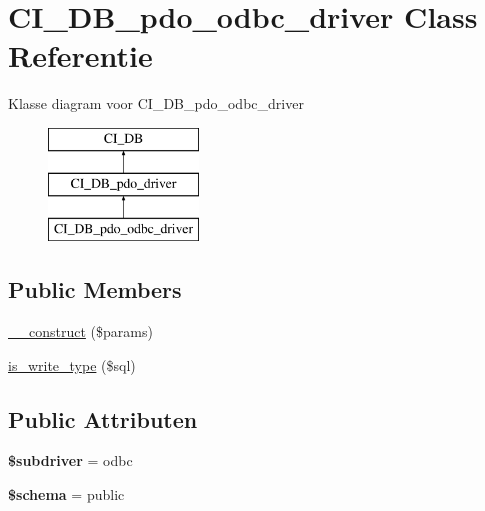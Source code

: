 \hypertarget{class_c_i___d_b__pdo__odbc__driver}{}\section{C\+I\+\_\+\+D\+B\+\_\+pdo\+\_\+odbc\+\_\+driver Class Referentie}
\label{class_c_i___d_b__pdo__odbc__driver}
Klasse diagram voor C\+I\+\_\+\+D\+B\+\_\+pdo\+\_\+odbc\+\_\+driver\begin{figure}[H]
\begin{center}
\leavevmode
\includegraphics[height=3.000000cm]{class_c_i___d_b__pdo__odbc__driver}
\end{center}
\end{figure}
\subsection*{Public Members}
\begin{DoxyCompactItemize}
\item 
\mbox{\hyperlink{class_c_i___d_b__pdo__odbc__driver_a9162320adff1a1a4afd7f2372f753a3e}{\+\_\+\+\_\+construct}} (\$params)
\item 
\mbox{\hyperlink{class_c_i___d_b__pdo__odbc__driver_af435df5703c238769d6d16fde6d51182}{is\+\_\+write\+\_\+type}} (\$sql)
\end{DoxyCompactItemize}
\subsection*{Public Attributen}
\begin{DoxyCompactItemize}
\item 
\mbox{\label{class_c_i___d_b__pdo__odbc__driver_a1322ca756348b11d080cb7a4f590de15}} 
{\bfseries \$subdriver} = \textquotesingle{}odbc\textquotesingle{}
\item 
\mbox{\label{class_c_i___d_b__pdo__odbc__driver_a83022b1d70799d2bde3d64dca9cb40ee}} 
{\bfseries \$schema} = \textquotesingle{}public\textquotesingle{}
\end{DoxyCompactItemize}
